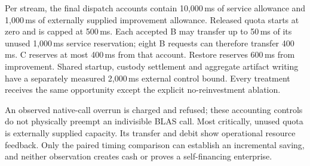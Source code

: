 Per stream, the final dispatch accounts contain 10,000\,ms of service allowance and 1,000\,ms of externally
supplied improvement allowance. Released quota starts at zero and is capped at 500\,ms. Each accepted B may
transfer up to 50\,ms of its unused 1,000\,ms service reservation; eight B requests can therefore transfer
400\,ms. C reserves at most 400\,ms from that account. Restore reserves 600\,ms from improvement. Shared startup,
custody settlement and aggregate artifact writing have a separately measured 2,000\,ms external control bound.
Every treatment receives the same opportunity except the explicit no-reinvestment ablation.

An observed native-call overrun is charged and refused; these accounting controls do not physically preempt
an indivisible BLAS call. Most critically, unused quota is externally supplied capacity. Its transfer and debit
show operational resource feedback. Only the paired timing comparison can establish an incremental saving,
and neither observation creates cash or proves a self-financing enterprise.
